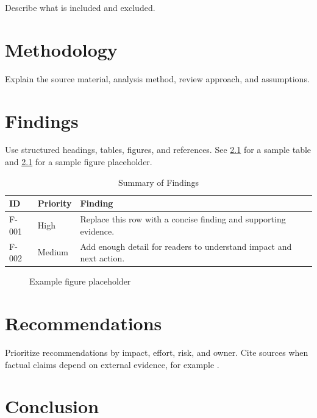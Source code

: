 \documentclass[11pt,a4paper,oneside]{scrreprt}
\begin{document}
Describe what is included and excluded.

\chapter{Methodology}
\label{chap:methodology}

Explain the source material, analysis method, review approach, and assumptions.

\chapter{Findings}
\label{chap:findings}

Use structured headings, tables, figures, and references. See \cref{tab:summary} for a sample table and \cref{fig:example} for a sample figure placeholder.

\begin{table}[htbp]
  \centering
  \caption{Summary of Findings}
  \label{tab:summary}
  \begin{tabularx}{\textwidth}{l l X}
    \toprule
    ID & Priority & Finding \\
    \midrule
    F-001 & High & Replace this row with a concise finding and supporting evidence. \\
    F-002 & Medium & Add enough detail for readers to understand impact and next action. \\
    \bottomrule
  \end{tabularx}
\end{table}

\begin{figure}[htbp]
  \centering
  \fbox{\rule{0pt}{45mm}\rule{0.85\textwidth}{0pt}}
  \caption{Example figure placeholder}
  \label{fig:example}
\end{figure}

\chapter{Recommendations}
\label{chap:recommendations}

Prioritize recommendations by impact, effort, risk, and owner. Cite sources when factual claims depend on external evidence, for example \parencite{knuth1984texbook}.

\chapter{Conclusion}
\label{chap:conclusion}
\end{document}
